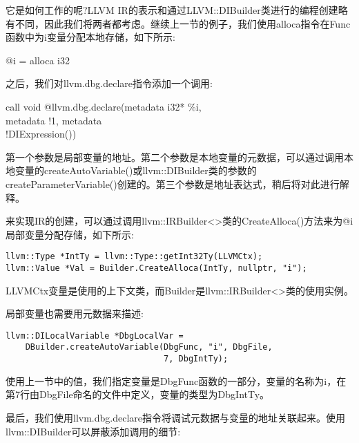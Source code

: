 它是如何工作的呢?LLVM IR的表示和通过LLVM::DIBuilder类进行的编程创建略有不同，因此我们将两者都考虑。继续上一节的例子，我们使用alloca指令在Func函数中为i变量分配本地存储，如下所示:\par

\begin{tcolorbox}[colback=white,colframe=black]
@i = alloca i32
\end{tcolorbox}

之后，我们对llvm.dbg.declare指令添加一个调用:\par

\begin{tcolorbox}[colback=white,colframe=black]
call void @llvm.dbg.declare(metadata i32* \%i, \\
\hspace*{3cm}metadata !1, metadata \\
\hspace*{3cm}!DIExpression())
\end{tcolorbox}

第一个参数是局部变量的地址。第二个参数是本地变量的元数据，可以通过调用本地变量的createAutoVariable()或llvm::DIBuilder类的参数的createParameterVariable()创建的。第三个参数是地址表达式，稍后将对此进行解释。\par

来实现IR的创建，可以通过调用llvm::IRBuilder<>类的CreateAlloca()方法来为@i局部变量分配存储，如下所示:\par

\begin{lstlisting}[caption={}]
llvm::Type *IntTy = llvm::Type::getInt32Ty(LLVMCtx);
llvm::Value *Val = Builder.CreateAlloca(IntTy, nullptr, "i");
\end{lstlisting}

LLVMCtx变量是使用的上下文类，而Builder是llvm::IRBuilder<>类的使用实例。\par

局部变量也需要用元数据来描述:\par

\begin{lstlisting}[caption={}]
llvm::DILocalVariable *DbgLocalVar =
	DBuilder.createAutoVariable(DbgFunc, "i", DbgFile,
								7, DbgIntTy);
\end{lstlisting}

使用上一节中的值，我们指定变量是DbgFunc函数的一部分，变量的名称为i，在第7行由DbgFile命名的文件中定义，变量的类型为DbgIntTy。\par

最后，我们使用llvm.dbg.declare指令将调试元数据与变量的地址关联起来。使用llvm::DIBuilder可以屏蔽添加调用的细节:\par

